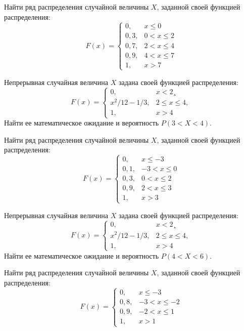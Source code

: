 \vfill

\newpage\setcounter{zad}{0}

\z Найти ряд распределения случайной величины $X$, заданной своей функцией распределения: $$ F(x) = \begin{cases}0, & x \leqslant 0 \\ 0{,}3, & 0 < x \leqslant 2 \\ 0{,}7, & 2 < x \leqslant 4 \\ 0{,}9, & 4 < x \leqslant 7 \\ 1, & x > 7 \end{cases} $$


\vfill

\z Непрерывная случайная величина $X$ задана своей функцией распределения: $$ F(x) = \begin{cases}0, & x < 2¸\\ x^2/12-1/3, & 2 \leqslant x \leqslant 4, \\ 1, & x > 4 \end{cases} $$ Найти ее математическое ожидание и вероятность $P(3 < X < 4)$.
 

\vfill

\newpage\setcounter{zad}{0}

\z Найти ряд распределения случайной величины $X$, заданной своей функцией распределения: $$ F(x) = \begin{cases}0, & x \leqslant -3 \\ 0{,}1, & -3 < x \leqslant 0 \\ 0{,}3, & 0 < x \leqslant 2 \\ 0{,}9, & 2 < x \leqslant 3 \\ 1, & x > 3 \end{cases} $$


\vfill

\z Непрерывная случайная величина $X$ задана своей функцией распределения: $$ F(x) = \begin{cases}0, & x < 2¸\\ x^2/12-1/3, & 2 \leqslant x \leqslant 4, \\ 1, & x > 4 \end{cases} $$ Найти ее математическое ожидание и вероятность $P(4 < X < 6)$.
 

\vfill

\newpage\setcounter{zad}{0}

\z Найти ряд распределения случайной величины $X$, заданной своей функцией распределения: $$ F(x) = \begin{cases}0, & x \leqslant -3 \\ 0{,}8, & -3 < x \leqslant -2 \\ 0{,}9, & -2 < x \leqslant 1 \\ 1, & x > 1 \end{cases} $$



